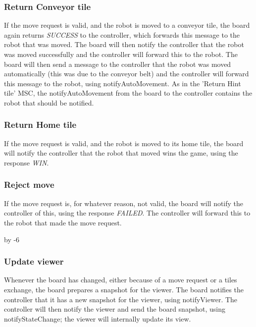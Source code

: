 	\subsubsection{Return Conveyor tile}
	\begin{minipage}{\linewidth}
		If the move request is valid, and the robot is moved to a conveyor tile, the board again returns \emph{SUCCESS} to the controller, which forwards this message to the robot that was moved. The board will then notify the controller that the robot was moved successfully and the controller will forward this to the robot. The board will then send a message to the controller that the robot was moved automatically (this was due to the conveyor belt) and the controller will forward this message to the robot, using notifyAutoMovement. As in the 'Return Hint tile' MSC, the notifyAutoMovement from the board to the controller contains the robot that should be notified.

		
	\end{minipage}

	\subsubsection{Return Home tile}
	\begin{minipage}{\linewidth}
	   If the move request is valid, and the robot is moved to its home tile, the board will notify the controller that the robot that moved wins the game, using the response \emph{WIN}.

		
	\end{minipage}

	\subsubsection{Reject move}
	\begin{minipage}{\linewidth}
		If the move request is, for whatever reason, not valid, the board will notify the controller of this, using the response \emph{FAILED}. The controller will forward this to the robot that made the move request.

		
	\end{minipage}

	\advance{} by -6

    \subsubsection{Update viewer}
	\begin{minipage}{\linewidth}
        Whenever the board has changed, either because of a move request or a tiles exchange, the board prepares a snapshot for the viewer.	The board notifies the controller that it has a new snapshot for the viewer, using notifyViewer. The controller will then notify the viewer and send the board snapshot, using notifyStateChange; the viewer will internally update its view.

		
	\end{minipage}


